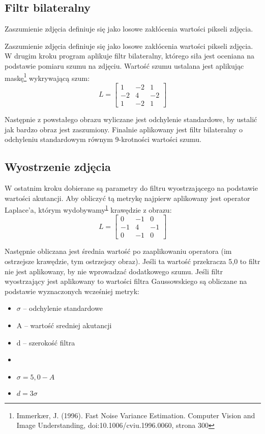 \documentclass[]{mwart}
\begin{document}
\subsection{Filtr bilateralny}
Zaszumienie zdjęcia definiuje się jako losowe zakłócenia wartości pikseli zdjęcia.

Zaszumienie zdjęcia definiuje się jako losowe
zakłócenia wartości pikseli zdjęcia.
W drugim kroku program aplikuje filtr bilateralny,
którego siła jest oceniana na podstawie pomiaru szumu na zdjęciu.
Wartość szumu ustalana jest aplikując maskę\footnote{\label{przyp1}Immerkær, J. (1996). Fast Noise Variance Estimation. Computer Vision and Image Understanding, doi:10.1006/cviu.1996.0060, strona 300 }
wykrywającą szum:
\[  L = \begin{bmatrix}
        1  & -2 & 1  \\
        -2 & 4  & -2 \\
        1  & -2 & 1
    \end{bmatrix}   \]

Następnie z powstałego obrazu wyliczane jest odchylenie standardowe,
by ustalić jak bardzo obraz jest zaszumiony. Finalnie aplikowany jest
filtr bilateralny o odchyleniu standardowym równym 9-krotności
wartości szumu.

\subsection{Wyostrzenie zdjęcia}
W ostatnim kroku dobierane są parametry do filtru wyostrzającego
na podstawie wartości akutancji.
Aby obliczyć tą metrykę najpierw aplikowany jest operator Laplace'a,
którym wydobywamy\textsuperscript{\ref{przyp1}}
krawędzie z obrazu:
\[  L = \begin{bmatrix}
        0  & -1 & 0  \\
        -1 & 4  & -1 \\
        0  & -1 & 0
    \end{bmatrix}\]

Następnie obliczana jest średnia wartość po zaaplikowaniu operatora
(im ostrzejsze krawędzie, tym ostrzejszy obraz).
Jeśli ta wartość przekracza 5,0 to filtr nie jest aplikowany,
by nie wprowadzać dodatkowego szumu.
Jeśli filtr wyostrzający jest aplikowany to wartości filtra
Gaussowskiego są obliczane na podstawie wyznaczonych wcześniej metryk:
\begin{itemize}[label={}, leftmargin=*]
    \item $\sigma$ -- odchylenie standardowe
    \item A -- wartość sredniej akutancji
    \item d -- szerokość filtra
    \item
    \item $\sigma = 5,0 - A$
    \item $d = 3 \sigma$
\end{itemize}
\end{document}
